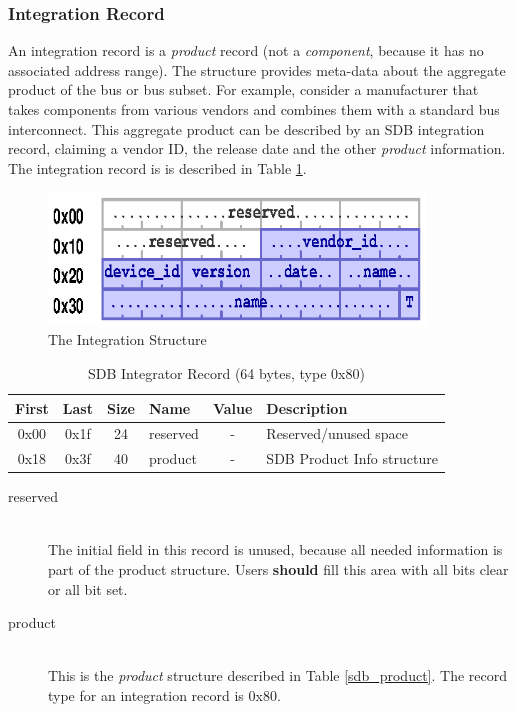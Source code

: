 \documentclass[a4paper, 12pt]{article}
\begin{document}
\pagebreak 

\subsubsection{Integration Record}

An integration record is a \textit{product} record (not a \textit{component}, because
it has no associated address range).
The structure provides meta-data about the aggregate product of the bus or bus subset.
For example, consider
a manufacturer that takes components from various vendors and combines them with a standard bus
interconnect. This aggregate product can be described by an SDB integration record, claiming
a vendor ID, the release date and the other \textit{product} information.
The integration record is is described in Table \ref{sdb_integrator}.

\begin{figure}[h]
\centering%
\includegraphics[width=100mm]{img/sdb-integration.ps}
\caption{The Integration Structure}
\label{fig:FigureIntegration}
\end{figure}

\begin{center}
  \begin{savenotes}
    \begin{table}[!ht]\footnotesize
      \caption{SDB Integrator Record (64 bytes, type 0x80)}\label{sdb_integrator}\centering
        \begin{tabular}{| c | c | c | l | c | p{5cm} |} \hline
        First & Last & Size & Name & Value & Description \\ \hline
        0x00 & 0x1f & 24 & reserved & - & Reserved/unused space \\ \hline
        0x18 & 0x3f & 40 & product & - & SDB Product Info structure \\ \hline
        \end{tabular}
    \end{table}
  \end{savenotes}
\end{center}

\begin{description}
\item[reserved] \hfill \\
The initial field in this record is unused, because all needed information is
part of the product structure. Users \textbf{should} fill this area with all bits
clear or all bit set.

\item[product] \hfill \\
This is the \textit{product} structure described in Table \ref{sdb_product}. The
record type for an integration record is 0x80.
\end{description}
\end{document}
